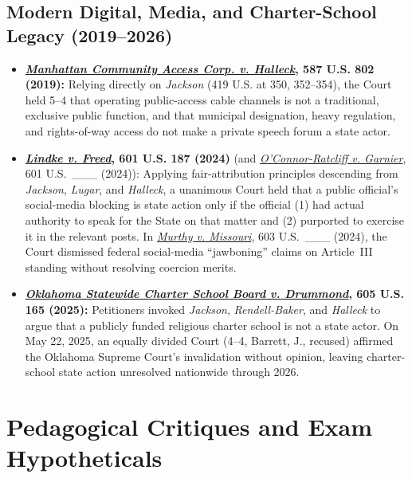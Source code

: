 \documentclass[12pt]{article}
\begin{document}
\subsection{Modern Digital, Media, and Charter-School Legacy (2019--2026)}
\begin{itemize}
  \item \textbf{\href{https://www.law.cornell.edu/supremecourt/text/17-1702}{\emph{Manhattan Community Access Corp. v. Halleck}}, 587 U.S. 802 (2019):} Relying directly on \emph{Jackson} (419 U.S. at 350, 352--354), the Court held 5--4 that operating public-access cable channels is not a traditional, exclusive public function, and that municipal designation, heavy regulation, and rights-of-way access do not make a private speech forum a state actor.
  \item \textbf{\href{https://www.law.cornell.edu/supremecourt/text/22-611}{\emph{Lindke v. Freed}}, 601 U.S. 187 (2024)} (and \href{https://supreme.justia.com/cases/federal/us/601/22-324/}{\emph{O'Connor-Ratcliff v. Garnier}}, 601 U.S.\ \_\_\_ (2024)): Applying fair-attribution principles descending from \emph{Jackson}, \emph{Lugar}, and \emph{Halleck}, a unanimous Court held that a public official's social-media blocking is state action only if the official (1) had actual authority to speak for the State on that matter and (2) purported to exercise it in the relevant posts. In \href{https://supreme.justia.com/cases/federal/us/603/23-411/}{\emph{Murthy v. Missouri}}, 603 U.S.\ \_\_\_ (2024), the Court dismissed federal social-media ``jawboning'' claims on Article~III standing without resolving coercion merits.
  \item \textbf{\href{https://www.law.cornell.edu/supct/cert/24-394}{\emph{Oklahoma Statewide Charter School Board v. Drummond}}, 605 U.S. 165 (2025):} Petitioners invoked \emph{Jackson}, \emph{Rendell-Baker}, and \emph{Halleck} to argue that a publicly funded religious charter school is not a state actor. On May 22, 2025, an equally divided Court (4--4, Barrett, J., recused) affirmed the Oklahoma Supreme Court's invalidation without opinion, leaving charter-school state action unresolved nationwide through 2026.
\end{itemize}

\section{Pedagogical Critiques and Exam Hypotheticals}
\end{document}
